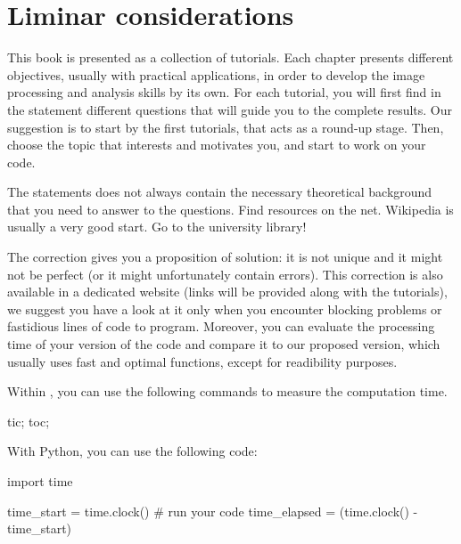 \section*{Liminar considerations}

This book is presented as a collection of tutorials. Each chapter presents different objectives, usually with practical applications, in order to develop the image processing and analysis skills by its own. 
For each tutorial, you will first find in the statement different questions that will guide you to the complete results. Our suggestion is to start by the first tutorials, that acts as a round-up stage. Then, choose the topic that interests and motivates you, and start to work on your code. 

The statements does not always contain the necessary theoretical background that you need to answer to the questions. Find resources on the net. Wikipedia is usually a very good start. Go to the university library!

The correction gives you a proposition of solution: it is not unique and it might not be perfect (or it might unfortunately contain errors). This correction is also available in a dedicated website (links will be provided along with the tutorials), we suggest you have a look at it only when you encounter blocking problems or fastidious lines of code to program. Moreover, you can evaluate the processing time of your version of the code and compare it to our proposed version, which usually uses fast and optimal functions, except for readibility purposes.

\begin{mcomment}
Within \matlabregistered{}, you can use the following commands to measure the computation time.
\begin{matlab}
tic;
toc;
\end{matlab}
\end{mcomment}

\begin{pcomment}
 With Python, you can use the following code:
 \begin{python}
import time

time_start = time.clock()
# run your code
time_elapsed = (time.clock() - time_start)
 \end{python}

\end{pcomment}

